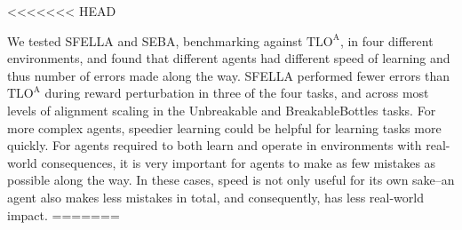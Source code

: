 
<<<<<<< HEAD


We tested SFELLA and SEBA, benchmarking against $\text{TLO}^\text{A}$, in four different environments, and found that different agents had different speed of learning and thus number of errors made along the way. SFELLA performed fewer errors than $\text{TLO}^\text{A}$ during reward perturbation in three of the four tasks, and across most levels of alignment scaling in the Unbreakable and BreakableBottles tasks. For more complex agents, speedier learning could be helpful for learning tasks more quickly. For agents required to both learn and operate in environments with real-world consequences, it is very important for agents to make as few mistakes as possible along the way. In these cases, speed is not only useful for its own sake--an agent also makes less mistakes in total, and consequently, has less real-world impact.
=======


